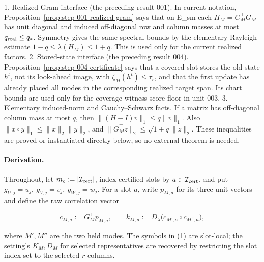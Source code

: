 1. Realized Gram interface (the preceding result 001).  In current notation,
   Proposition~\ref{prop:step-001-realized-gram} says that on E\_sm each
   $H_M=G_M^\top G_M$ has unit diagonal and induced off-diagonal row and
   column masses at most $q_{\rm real}\le q_*$. Symmetry gives the same
   spectral bounds by the elementary Rayleigh estimate
   $1-q\le\lambda(H_M)\le1+q$. This is used only for the current realized
   factors.
2. Stored-state interface (the preceding result 004).
   Proposition~\ref{prop:step-004-certificate} says that a covered slot stores
   the old state $h^t$, not its look-ahead image, with
   $\zeta_M(h^t)\le\tau_r$, and that the first update has already placed all
   modes in the corresponding realized target span.  Its chart bounds are
   used only for the coverage-witness score floor in unit 003.
3. Elementary induced-norm and Cauchy--Schwarz facts.  If a matrix has
   off-diagonal column mass at most $q$, then
   $\|(H-I)v\|_1\le q\|v\|_1$. Also
   $\|x\circ y\|_1\le\|x\|_2\|y\|_2$, and
   $\|G_M^\top z\|_2\le\sqrt{1+q}\|z\|_2$. These inequalities are
   proved or instantiated directly below, so no external theorem is needed.

\paragraph{Derivation.}

Throughout, let $m_c:=|\mathcal I_{\rm cert}|$, index certified slots by
$a\in\mathcal I_{\rm cert}$, and put
$g_{U,j}=u_j,\ g_{V,j}=v_j,\ g_{W,j}=w_j$.  For a slot $a$, write
$p_{M,a}$ for its three unit vectors and define the raw correlation vector

\[
c_{M,a}:=G_M^\top p_{M,a},\qquad
k_{M,a}:=D_\lambda\bigl(c_{M',a}\circ c_{M'',a}\bigr),
\tag{1}
\]

where $M',M''$ are the two held modes.  The symbols in (1) are slot-local;
the setting's $K_M,D_M$ for selected representatives are recovered by
restricting the slot index set to the selected $r$ columns.


